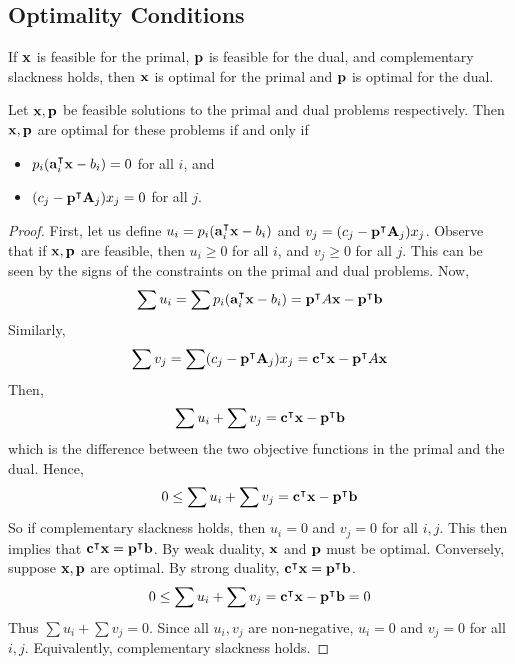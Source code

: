\subsection{Optimality Conditions}
If \( \vb x \) is feasible for the primal, \( \vb p \) is feasible for the dual, and complementary slackness holds, then \( \vb x \) is optimal for the primal and \( \vb p \) is optimal for the dual.
\begin{theorem}
	Let \( \vb x, \vb p \) be feasible solutions to the primal and dual problems respectively.
	Then \( \vb x, \vb p \) are optimal for these problems if and only if
	\begin{itemize}
		\item \( p_i (\vb a_i^\intercal \vb x - b_i) = 0 \) for all \( i \), and
		\item  \( (c_j - \vb p^\intercal \vb A_j) x_j = 0 \) for all \( j \).
	\end{itemize}
\end{theorem}
\begin{proof}
	First, let us define \( u_i = p_i (\vb a_i^\intercal \vb x - b_i ) \) and \( v_j = (c_j - \vb p^\intercal \vb A_j) x_j \).
	Observe that if \( \vb x, \vb p \) are feasible, then \( u_i \geq 0 \) for all \( i \), and \( v_j \geq 0 \) for all \( j \).
	This can be seen by the signs of the constraints on the primal and dual problems.
	Now,
	\[
		\sum u_i = \sum p_i (\vb a_i^\intercal \vb x - b_i ) = \vb p^\intercal A \vb x - \vb p^\intercal \vb b
	\]
	Similarly,
	\[
		\sum v_j = \sum (c_j - \vb p^\intercal \vb A_j) x_j = \vb c^\intercal \vb x - \vb p^\intercal A \vb x
	\]
	Then,
	\[
		\sum u_i + \sum v_j = \vb c^\intercal \vb x - \vb p^\intercal \vb b
	\]
	which is the difference between the two objective functions in the primal and the dual.
	Hence,
	\[
		0 \leq \sum u_i + \sum v_j = \vb c^\intercal \vb x - \vb p^\intercal \vb b
	\]
	So if complementary slackness holds, then \( u_i = 0 \) and \( v_j = 0 \) for all \( i, j \).
	This then implies that \( \vb c^\intercal \vb x = \vb p^\intercal \vb b \).
	By weak duality, \( \vb x \) and \( \vb p \) must be optimal.
	Conversely, suppose \( \vb x, \vb p \) are optimal.
	By strong duality, \( \vb c^\intercal \vb x = \vb p^\intercal \vb b \).
	\[
		0 \leq \sum u_i + \sum v_j = \vb c^\intercal \vb x - \vb p^\intercal \vb b = 0
	\]
	Thus \( \sum u_i + \sum v_j = 0 \).
	Since all \( u_i, v_j \) are non-negative, \( u_i = 0 \) and \( v_j = 0 \) for all \( i, j \).
	Equivalently, complementary slackness holds.
\end{proof}

